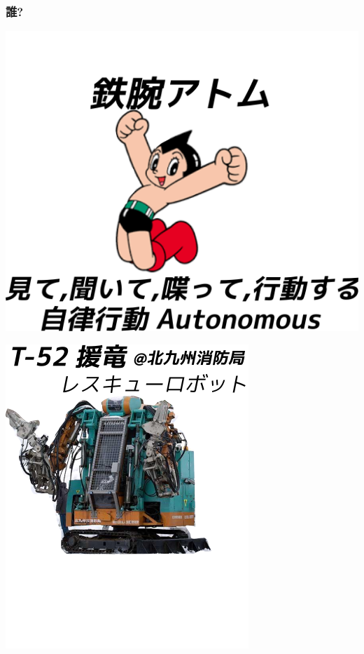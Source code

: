 \subsubsection{誰?}
\label{sec:orgheadline3}

\begin{container-fluid}
\begin{row-fluid}
\begin{span6}
\includegraphics{img/astro/final.png}
\end{span6}
\begin{span6}
\includegraphics{img/rescue/2.png}
\end{span6}
\end{row-fluid}
\begin{row-fluid}
\begin{span12}
\begin{xlarge}
　
\end{xlarge}
\end{span12}
\end{row-fluid}
\end{container-fluid}

